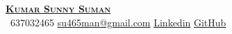 \begin{center}
    \textbf{{\href{https://linktr.ee/i_m_k_s_s}{ \Huge \scshape Kumar Sunny Suman}}} \\ \vspace{1pt}
     \ \small 637032465 \quad
    \href{mailto:su465man@gmail.com}{ {su465man@gmail.com}} \quad
    \href{https://www.linkedin.com/in/imkss/}{ {Linkedin}} \quad
    \href{https://github.com/imkss}{ {GitHub}}
\end{center}